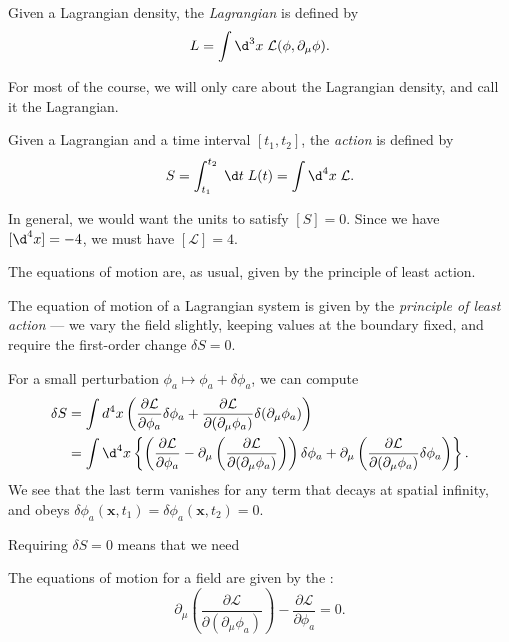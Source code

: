 \documentclass[a4paper]{article}
\begin{document}
\begin{defi}[Lagrangian]
  Given a Lagrangian density, the \emph{Lagrangian} is defined by
  \[
    L = \int \d^3 x\; \mathcal{L}(\phi, \partial_\mu \phi).
  \]
\end{defi}
For most of the course, we will only care about the Lagrangian density, and call it the Lagrangian.

\begin{defi}[Action]
  Given a Lagrangian and a time interval $[t_1, t_2]$, the \emph{action} is defined by
  \[
    S = \int_{t_1}^{t_2} \;\d t\; L(t) = \int \d^4 x\; \mathcal{L}.
  \]
\end{defi}
In general, we would want the units to satisfy $[S] = 0$. Since we have $[\d^4 x] = -4$, we must have $[\mathcal{L}] = 4$.

The equations of motion are, as usual, given by the principle of least action.
\begin{defi}
  The equation of motion of a Lagrangian system is given by the \emph{principle of least action} --- we vary the field slightly, keeping values at the boundary fixed, and require the first-order change $\delta S = 0$.
\end{defi}

For a small perturbation $\phi_a \mapsto \phi_a + \delta \phi_a$, we can compute
\begin{align*}
  \delta S &= \int d^4 x\left(\frac{\partial \mathcal{L}}{\partial \phi_a} \delta \phi_a + \frac{\partial \mathcal{L}}{\partial (\partial_\mu \phi_a)} \delta(\partial_\mu\phi_a)\right)\\
  &= \int \d^4 x \left\{\left(\frac{\partial \mathcal{L}}{\partial \phi_a} - \partial_\mu\left(\frac{\partial \mathcal{L}}{\partial (\partial_\mu\phi_a)}\right)\right) \delta \phi_a + \partial_\mu \left(\frac{\partial \mathcal{L}}{\partial (\partial_\mu\phi_a)} \delta\phi_a\right)\right\}.
\end{align*}
We see that the last term vanishes for any term that decays at spatial infinity, and obeys $\delta \phi_a(\mathbf{x}, t_1) = \delta\phi_a(\mathbf{x}, t_2) = 0$.

Requiring $\delta S = 0$ means that we need
\begin{prop}
  The equations of motion for a field are given by the :
  \[
    \partial_\mu\left(\frac{\partial \mathcal{L}}{\partial (\partial_\mu \phi_a)}\right) - \frac{\partial \mathcal{L}}{\partial \phi_a} = 0.
  \]
\end{prop}
\end{document}

